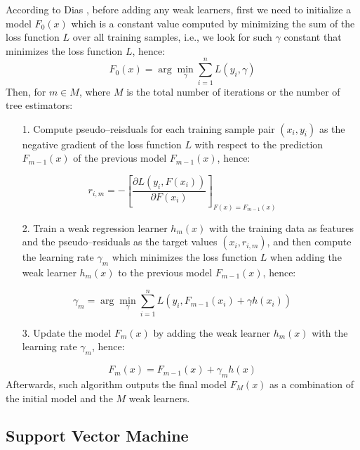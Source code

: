 According to Dias \citep{dias2018comparison}, before adding any weak learners, first we need to initialize a model $F_0(x)$ which is a constant value computed by minimizing the sum of the loss function $L$ over all training samples, i.e., we look for such $\gamma$ constant that minimizes the loss function $L$, hence:
\begin{equation}
    F_{0}(x) = \arg \min _{\gamma} \sum_{i=1}^{n} L\left(y_{i}, \gamma\right)
\end{equation}
Then, for $m \in M$, where $M$ is the total number of iterations or the number of tree estimators:
\begin{itemize}\setlength\itemsep{0em}
    \item[1.] Compute pseudo--reisduals for each training sample pair $(x_i, y_i)$ as the negative gradient of the loss function $L$ with respect to the prediction $F_{m-1}(x)$ of the previous model $F_{m-1}(x)$, hence:
\end{itemize}
\begin{equation}
    r_{i,m} = -\left[\frac{\partial L\left(y_{i}, F\left(x_{i}\right)\right)}{\partial F\left(x_{i}\right)}\right]_{F(x)=F_{m-1}(x)}
\end{equation}
\begin{itemize}\setlength\itemsep{0em}
    \item[2.] Train a weak regression learner $h_m(x)$ with the training data as features and the pseudo--residuals as the target values $(x_i, r_{i,m})$, and then compute the learning rate $\gamma_m$ which minimizes the loss function $L$ when adding the weak learner $h_m(x)$ to the previous model $F_{m-1}(x)$, hence:
\end{itemize}
\begin{equation}
    \gamma_{m} = \arg \min _{\gamma} \sum_{i=1}^{n} L\left(y_{i}, F_{m-1}\left(x_{i}\right)+\gamma h\left(x_{i}\right)\right)
\end{equation}
\begin{itemize}\setlength\itemsep{0em}
    \item[3.] Update the model $F_m(x)$ by adding the weak learner $h_m(x)$ with the learning rate $\gamma_m$, hence:
\end{itemize}
\begin{equation}
    F_m(x) = F_{m-1}(x) + \gamma_m h(x)
\end{equation}
Afterwards, such algorithm outputs the final model $F_M(x)$ as a combination of the initial model and the $M$ weak learners.

\subsection{Support Vector Machine}

